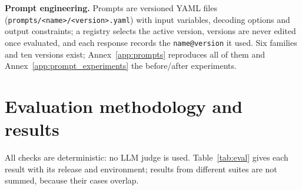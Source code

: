\documentclass[10pt,a4paper]{article}
\newcommand{\code}[1]{\texttt{\small #1}}
\begin{document}
\textbf{Prompt engineering.} Prompts are versioned YAML files (\code{prompts/<name>/<version>.yaml}) with
input variables, decoding options and output constraints; a registry selects the active version, versions are
never edited once evaluated, and each response records the \code{name@version} it used. Six families and ten
versions exist; Annex~\ref{app:prompts} reproduces all of them and Annex~\ref{app:prompt_experiments} the
before/after experiments.

\section{Evaluation methodology and results}\label{sec:eval}
All checks are deterministic: no LLM judge is used. Table~\ref{tab:eval} gives each result with its release
and environment; results from different suites are not summed, because their cases overlap.
\end{document}
